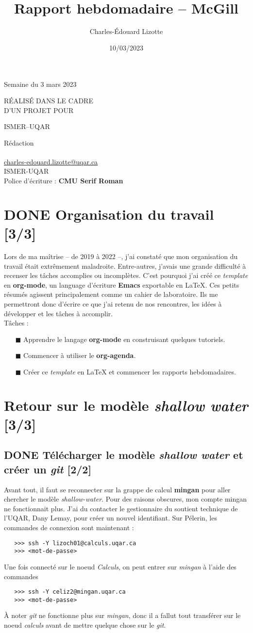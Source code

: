 \documentclass[10pt]{article}
\author{Charles-Édouard Lizotte}
\date{10/03/2023}
\title{Rapport hebdomadaire -- McGill}
\makeatletter
\numberwithin{equation}{section}
\renewcommand{\boxtimes}{\blacksquare}
\newcommand{\mytitlepage}{
\begin{titlepage}
\begin{center}
{\Huge \thesubtitle \par}
\vspace{2cm}
{\Huge \MakeUppercase{\thetitle} \par}
\vspace{2cm}
RÉALISÉ DANS LE CADRE\\ D'UN PROJET POUR \par
\vspace{2cm}
{\Huge ISMER--UQAR \par}
\vspace{2cm}
{\thedate}
\end{center}
\vfill
Rédaction \\
{\theauthor}\\
\url{charles-edouard.lizotte@uqar.ca}\\
ISMER-UQAR\\
Police d'écriture : \textbf{CMU Serif Roman}
\end{titlepage}
}
\newcommand{\thesubtitle}{Semaine du 3 mars 2023}
\makeatother
\begin{document}
\mytitlepage
\tableofcontents\newpage
\section{{\bfseries\sffamily DONE} Organisation du travail [3/3]}
\label{sec:org3199635}
Lors de ma maîtrise -- de 2019 à 2022 --, j'ai constaté que mon organisation du travail était extrêmement maladroite.
Entre-autres, j'avais une grande difficulté à recenser les tâches accomplies ou incomplètes. 
C'est pourquoi j'ai créé ce \emph{template} en \textbf{org-mode}, un language d'écriture \textbf{Emacs} exportable en \LaTeX{}.
Ces petits résumés agissent principalement comme un cahier de laboratoire. 
Ils me permettront donc d'écrire ce que j'ai retenu de nos rencontres, les idées à développer et les tâches à accomplir.\\

Tâches : 
\begin{itemize}
\item[{$\boxtimes$}] Apprendre le langage \textbf{org-mode} en construisant quelques tutoriels.
\item[{$\boxtimes$}] Commencer à utiliser le \textbf{org-agenda}.
\item[{$\boxtimes$}] Créer ce \emph{template} en \LaTeX{} et commencer les rapports hebdomadaires.
\end{itemize}
\section{Retour sur le modèle \emph{shallow water} [3/3]}
\label{sec:orgd071aa4}
\subsection{{\bfseries\sffamily DONE} Télécharger le modèle \emph{shallow water} et créer un \emph{git} [2/2]}
\label{sec:org34025bd}
Avant tout, il faut se reconnecter sur la grappe de calcul \textbf{mingan} pour aller chercher le modèle \emph{shallow-water}. 
Pour des raisons obscures, mon compte mingan ne fonctionnait plus.
J'ai du contacter le gestionnaire du soutient technique de l'UQAR, Dany Lemay, pour créer un nouvel identifiant. 
Sur Pélerin, les commandes de connexion sont maintenant : 
\begin{verbatim}
   >>> ssh -Y lizoch01@calculs.uqar.ca
   >>> <mot-de-passe>
\end{verbatim}

Une fois connecté sur le noeud \emph{Calculs}, on peut entrer sur \emph{mingan} à l'aide des commandes
\begin{verbatim}
   >>> ssh -Y celiz2@mingan.uqar.ca
   >>> <mot-de-passe>
\end{verbatim}
À noter \emph{git} ne fonctionne plus sur \emph{mingan}, donc il a fallut tout transférer sur le noeud \emph{calculs} avant de mettre quelque chose sur le \emph{git}.\\
\end{document}
